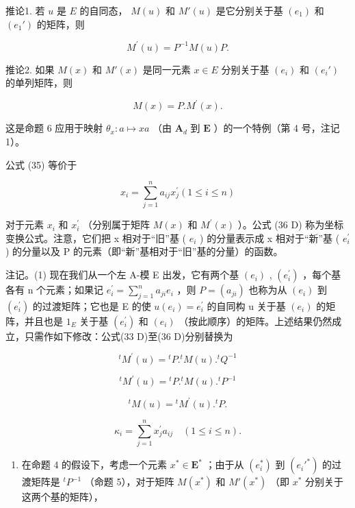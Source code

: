 推论1. 若 \(u\) 是 \(E\) 的自同态， \(M(u)\) 和 \(M'(u)\) 是它分别关于基 \((e_1)\) 和 \((e_1')\) 的矩阵，则

\[
M ^ {\prime} (u) = P ^ {- 1} M (u) P.\tag{34 D}
\]

推论2. 如果 \(M(x)\) 和 \(M'(x)\) 是同一元素 \(x \in E\) 分别关于基 \((e_i)\) 和 \((e_i')\) 的单列矩阵，则

\[
M (x) = P. M ^ {\prime} (x).\tag{35 D}
\]

这是命题 6 应用于映射 \(\theta_{x}:a\mapsto xa\) （由 \(\mathbf{A}_d\) 到 \(\mathbf{E}\) ）的一个特例（第 4 号，注记 1）。

公式 (35) 等价于

\[
x _ {i} = \sum_ {j = 1} ^ {n} a _ {i j} x _ {j} ^ {\prime} (1 \leqslant i \leqslant n)\tag{36 D}
\]

对于元素 \(x_{i}\) 和 \(x_{i}^{\prime}\) （分别属于矩阵 \(M(x)\) 和 \(M^{\prime}(x)\) ）。公式 (36 D) 称为坐标变换公式。注意，它们把 x 相对于“旧”基 ( \(e_{i}\) ) 的分量表示成 x 相对于“新”基 ( \(e_{i}^{\prime}\) ) 的分量以及 P 的元素（即“新”基相对于“旧”基的分量）的函数。

注记。(1) 现在我们从一个左 A-模 E 出发，它有两个基 \((e_{i})\) , \((e_{i}^{\prime})\) ，每个基各有 n 个元素；如果记 \(e_{i}^{\prime} = \sum_{j=1}^{n} a_{ji} e_{i}\) ，则 \(P = (a_{ji})\) 也称为从 \((e_{i})\) 到 \((e_{i}^{\prime})\) 的过渡矩阵；它也是 E 的使 \(u(e_{i}) = e_{i}^{\prime}\) 的自同构 u 关于基 \((e_{i})\) 的矩阵，并且也是 \(1_{E}\) 关于基 \((e_{i}^{\prime})\) 和 \((e_{i})\) （按此顺序）的矩阵。上述结果仍然成立，只需作如下修改：公式(33 D)至(36 D)分别替换为

\[
{ } ^ { t } M ^ { \prime } ( u ) = { } ^ { t } P . { } ^ { t } M ( u ) . { } ^ { t } Q ^ { - 1 }\tag{33 G}
\]

\[
{ } ^ { t } M ^ { \prime } ( u ) = { } ^ { t } P . { } ^ { t } M ( u ) . { } ^ { t } P ^ { - 1 }\tag{34 G}
\]

\[
{ } ^ { t } M ( u ) = { } ^ { t } M ^ { \prime } ( u ) . { } ^ { t } P .\tag{35 G}
\]

\[
\kappa_ {i} = \sum_ {j = 1} ^ {n} x _ {j} ^ {\prime} a _ {i j} \quad (1 \leqslant i \leqslant n).\tag{36 G}
\]

\begin{enumerate}
\def\labelenumi{(\arabic{enumi})}
\setcounter{enumi}{1}
\tightlist
\item
  在命题 4 的假设下，考虑一个元素 \(x^{*} \in \mathbf{E}^{*}\) ；由于从 \((e_i^*)\) 到 \((e_i'^*)\) 的过渡矩阵是 \(^tP^{-1}\) （命题 5），对于矩阵 \(M(x^{*})\) 和 \(M'(x^{*})\) （即 \(x^{*}\) 分别关于这两个基的矩阵），
\end{enumerate}

